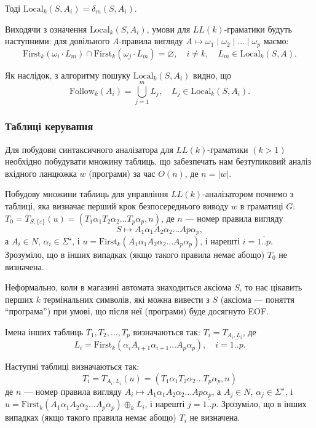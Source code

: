 Тоді $\text{Local}_k(S, A_i) = \delta_m(S, A_i)$. \medskip

Виходячи з означення $\text{Local}_k(S, A_i)$, умови для $LL(k)$-граматики будуть наступними: для довільного $A$-правила вигляду $A \mapsto \omega_1 \mid \omega_2 \mid \ldots \mid \omega_p$ маємо: \[\text{First}_k (\omega_i \cdot L_m) \cap \text{First}_k(\omega_j \cdot L_m) = \varnothing, \quad i \ne k, \quad L_m \in \text{Local}_k(S, A).\]

Як наслідок, з алгоритму пошуку $\text{Local}_k(S, A_i)$ видно, що \[ \text{Follow}_k(A_i) = \bigcup_{j = 1}^m L_j, \quad L_j \in \text{Local}_k(S, A_i).\]

\subsubsection{Таблиці керування}

Для побудови синтаксичного аналізатора для $LL(k)$-граматики $(k > 1)$ необхідно побудувати множину таблиць, що забезпечать нам безтупиковий аналіз вхідного ланцюжка $w$ (програми) за час $O(n)$, де $n = \vert w\vert$. \medskip

Побудову множини таблиць для управління $LL(k)$-аналізатором почнемо з таблиці, яка визначає перший крок безпосереднього виводу $w$ в граматиці $G$: $T_0 = T_{S, \{\varepsilon\}}(u) = (T_1\alpha_1T_2\alpha_2\ldots T_p\alpha_p, n)$, де $n$ --- номер правила вигляду
\begin{equation}
    S\mapsto A_1\alpha_1A_2\alpha_2\ldots Ap\alpha_p,
\end{equation}
а $A_i \in N$, $\alpha_i \in \Sigma^\star$, і $u = \text{First}_k(A_1\alpha_1A_2\alpha_2\ldots A_p\alpha_p)$, і нарешті $i = \overline{1..p}$. Зрозуміло, що в інших випадках (якщо такого правила немає абощо) $T_0$ не визначена. \medskip

Неформально, коли в магазині автомата знаходиться аксіома $S$, то нас цікавить перших $k$ термінальних символів, які можна вивести з $S$ (аксіома --- поняття ``програма'') при умові, що після неї (програми) буде досягнуто EOF. \medskip

Імена інших таблиць $T_1, T_2, \ldots, T_p$ визначаються так: $T_i = T_{A_i, L_i}$, де
\begin{equation}
    L_i = \text{First}_k(\alpha_i A_{i + 1} \alpha_{i + 1} \ldots A_p \alpha_p), \quad i = \overline{1..p}.
\end{equation}

Наступні таблиці визначаються так:
\begin{equation}
    T_i = T_{A_i, L_i}(u) = (T_1\alpha_1T_2\alpha_2\ldots T_p\alpha_p, n)
\end{equation}
де $n$ --- номер правила вигляду $A_i\mapsto A_1\alpha_1A_2\alpha_2\ldots Ap\alpha_p$, а $A_j \in N$, $\alpha_j \in \Sigma^\star$, і $u = \text{First}_k(A_1\alpha_1A_2\alpha_2\ldots A_p\alpha_p) \oplus_k L_i$, і нарешті $j = \overline{1..p}$. Зрозуміло, що в інших випадках (якщо такого правила немає абощо) $T_i$ не визначена. \medskip

